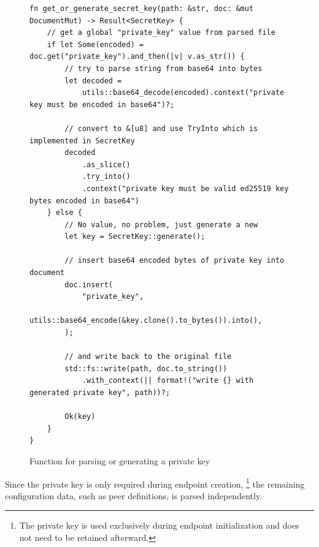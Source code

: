 \documentclass[a4paper, 10pt]{article}
\begin{document}
\begin{figure}[H]
  \begin{verbatim}
fn get_or_generate_secret_key(path: &str, doc: &mut DocumentMut) -> Result<SecretKey> {
    // get a global "private_key" value from parsed file
    if let Some(encoded) = doc.get("private_key").and_then(|v| v.as_str()) {
        // try to parse string from base64 into bytes
        let decoded =
            utils::base64_decode(encoded).context("private key must be encoded in base64")?;

        // convert to &[u8] and use TryInto which is implemented in SecretKey
        decoded
            .as_slice()
            .try_into()
            .context("private key must be valid ed25519 key bytes encoded in base64")
    } else {
        // No value, no problem, just generate a new
        let key = SecretKey::generate();

        // insert base64 encoded bytes of private key into document
        doc.insert(
            "private_key",
            utils::base64_encode(&key.clone().to_bytes()).into(),
        );

        // and write back to the original file
        std::fs::write(path, doc.to_string())
            .with_context(|| format!("write {} with generated private key", path))?;

        Ok(key)
    }
}
  \end{verbatim}
  \caption{Function for parsing or generating a private key}
\end{figure}

\newpage

Since the private key is only required during endpoint creation,
\footnote{The private key is used exclusively during endpoint initialization and does not need to be retained afterward.}
the remaining configuration data, such as peer definitions, is parsed independently.
\end{document}
